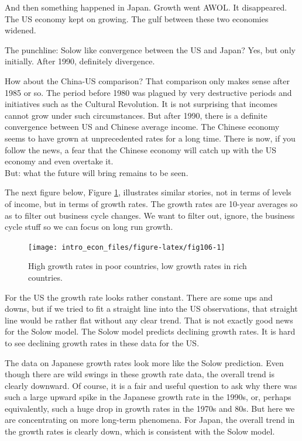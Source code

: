\documentclass[
]{book}
\begin{document}
And then something happened in Japan. Growth went AWOL. It disappeared. The US economy kept on growing. The gulf between these two economies widened.

The punchline: Solow like convergence between the US and Japan? Yes, but only initially. After 1990, definitely divergence.

How about the China-US comparison? That comparison only makes sense after 1985 or so. The period before 1980 was plagued by very destructive periods and initiatives such as the Cultural Revolution. It is not surprising that incomes cannot grow under such circumstances. But after 1990, there is a definite convergence between US and Chinese average income. The Chinese economy seems to have grown at unprecedented rates for a long time. There is now, if you follow the news, a fear that the Chinese economy will catch up with the US economy and even overtake it.\\
But: what the future will bring remains to be seen.

The next figure below, Figure \ref{fig:fig106}, illustrates similar stories, not in terms of levels of income, but in terms of growth rates. The growth rates are 10-year averages so as to filter out business cycle changes. We want to filter out, ignore, the business cycle stuff so we can focus on long run growth.

\begin{figure}

{\centering \texttt{[image: intro\_econ\_files/figure-latex/fig106-1]} 

}

\caption{High growth rates in poor countries, low growth rates in rich countries.}\label{fig:fig106}
\end{figure}

For the US the growth rate looks rather constant. There are some ups and downs, but if we tried to fit a straight line into the US observations, that straight line would be rather flat without any clear trend. That is not exactly good news for the Solow model. The Solow model predicts declining growth rates. It is hard to see declining growth rates in these data for the US.

The data on Japanese growth rates look more like the Solow prediction. Even though there are wild swings in these growth rate data, the overall trend is clearly downward. Of course, it is a fair and useful question to ask why there was such a large upward spike in the Japanese growth rate in the 1990s, or, perhaps equivalently, such a huge drop in growth rates in the 1970s and 80s. But here we are concentrating on more long-term phenomena. For Japan, the overall trend in the growth rates is clearly down, which is consistent with the Solow model.
\end{document}
